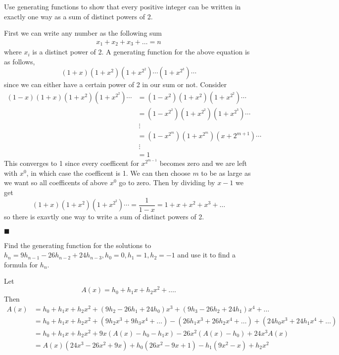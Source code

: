 \documentclass[12pt]{article}
\author{Warren Atkison}
\date{\today}
\renewcommand{\qed}{\hfill$\blacksquare$}
\renewenvironment{proof}{\vspace{1em}\begin{addmargin}[2em]{0em}\begin{newproof}}{\end{newproof}\end{addmargin}\qed}
\newenvironment{exercise}[2][Exercise]{\begin{trivlist}
\item[\hskip \labelsep {\bfseries #1} \hskip \labelsep {\bfseries #2.}]}{\end{trivlist}}
\begin{document}
\fancyhf{}
\fancyhead[R]{\today}
\fancyfoot[R]{\thepage}

\begin{exercise}{3.1.8 (3pt)}
	Use generating functions to show that every positive integer can be written in exactly one way as a sum of distinct powers of 2.
\end{exercise}
\begin{proof} First we can write any number as the following sum
	\begin{align*}
		x_1 + x_2 + x_3 + \ldots = n
	\end{align*}
	where $x_i$ is a distinct power of 2. A generating function for the above equation is as follows,
	\[
		(1 + x)(1 + x^2)(1 + x^{2^2})\cdots(1 + x^{2^k})\cdots
	\]	
	since we can either have a certain power of 2 in our sum or not. Consider
	\begin{align*}
		(1 - x)(1 + x)(1 + x^2)(1 + x^{2^2}) \cdots &= (1 - x^2)(1 + x^2)(1 + x^{2^2})\cdots \\
							    &= (1 - x^{2^2})(1 + x^{2^2})(1 + x^{2^3})\cdots \\
							    &~\vdots \\
							    &= (1 - x^{2^m})(1 + x^{2^m})(x + 2^{m+1})\cdots \\
							    &~\vdots \\
							    &= 1
	\end{align*}
	This converges to 1 since every coefficent for $x^{2^{m-1}}$ becomes zero and we are left with $x^0$, in which case the coefficent is 1. We can then choose $m$ to be as large as we want so all coefficents of above $x^0$ go to zero. Then by dividing by $x - 1$ we get
	\[
		(1 + x)(1 + x^2)(1 + x^{2^2})\cdots = \frac{1}{1 - x} = 1 + x + x^2 + x^3 + \ldots
	\]
	so there is exavtly one way to write a sum of distinct powers of 2.
\end{proof}
\begin{exercise}{3.4.6 (3pt)}
	Find the generating function for the solutions to $h_n = 9h_{n-1} - 26h_{n-2} + 24h_{n-3}, h_0 = 0, h_1 = 1, h_2 = -1$ and use it to find a formula for $h_n$.	
\end{exercise}	
Let
\[
	A(x) = h_0 + h_1x + h_2x^2 + \ldots.
\]
Then
\begin{align*}
	A(x) &= h_0 + h_1x + h_2x^2 + (9h_2 - 26h_1 + 24h_{0})x^3 + (9h_3 - 26h_2 + 24h_1)x^4 + \ldots \\
	     &= h_0 + h_1x + h_2x^2 + (9h_2x^3 + 9h_3x^4 + \ldots) - (26h_1x^3 + 26h_2x^4 + \ldots) + (24h_0x^3 + 24h_1x^4 + \ldots) \\
	     &= h_0 + h_1x + h_2x^2 + 9x(A(x) - h_0 - h_1x) - 26x^2(A(x) - h_0) + 24x^3A(x) \\
	     &= A(x)(24x^3 - 26x^2 + 9x) + h_0(26x^2 - 9x + 1) - h_1(9x^2 - x) + h_2x^2
\end{align*}
\end{document}
